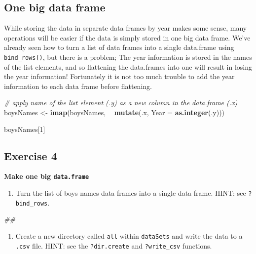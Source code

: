 \documentclass[
]{book}
\newenvironment{Shaded}{\begin{snugshade}}{\end{snugshade}}
\newcommand{\CommentTok}[1]{\textcolor[rgb]{0.56,0.35,0.01}{\textit{#1}}}
\newcommand{\DataTypeTok}[1]{\textcolor[rgb]{0.13,0.29,0.53}{#1}}
\newcommand{\DecValTok}[1]{\textcolor[rgb]{0.00,0.00,0.81}{#1}}
\newcommand{\KeywordTok}[1]{\textcolor[rgb]{0.13,0.29,0.53}{\textbf{#1}}}
\newcommand{\NormalTok}[1]{#1}
\newcommand{\OperatorTok}[1]{\textcolor[rgb]{0.81,0.36,0.00}{\textbf{#1}}}
\newcommand{\StringTok}[1]{\textcolor[rgb]{0.31,0.60,0.02}{#1}}
\providecommand{\tightlist}{%
  \setlength{\itemsep}{0pt}\setlength{\parskip}{0pt}}
\begin{document}
\hypertarget{one-big-data-frame}{%
\subsection{One big data frame}\label{one-big-data-frame}}

While storing the data in separate data frames by year makes some sense,
many operations will be easier if the data is simply stored in one big
data frame. We've already seen how to turn a list of data frames into a
single data.frame using \texttt{bind\_rows()}, but there is a problem; The year
information is stored in the names of the list elements, and so
flattening the data.frames into one will result in losing the year
information! Fortunately it is not too much trouble to add the year
information to each data frame before flattening.

\begin{Shaded}
\begin{Highlighting}[]
\CommentTok{# apply name of the list element (.y) as a new column in the data.frame (.x)}
\NormalTok{boysNames <-}\StringTok{ }\KeywordTok{imap}\NormalTok{(boysNames, }\OperatorTok{~}\StringTok{ }\KeywordTok{mutate}\NormalTok{(.x, }\DataTypeTok{Year =} \KeywordTok{as.integer}\NormalTok{(.y)))}

\NormalTok{boysNames[}\DecValTok{1}\NormalTok{]}
\end{Highlighting}
\end{Shaded}

\hypertarget{exercise-4-1}{%
\subsection{Exercise 4}\label{exercise-4-1}}

\textbf{Make one big \texttt{data.frame}}

\begin{enumerate}
\def\labelenumi{\arabic{enumi}.}
\tightlist
\item
  Turn the list of boys names data frames into a single data frame. HINT: see \texttt{?bind\_rows}.
\end{enumerate}

\begin{Shaded}
\begin{Highlighting}[]
\CommentTok{## }
\end{Highlighting}
\end{Shaded}

\begin{enumerate}
\def\labelenumi{\arabic{enumi}.}
\setcounter{enumi}{1}
\tightlist
\item
  Create a new directory called \texttt{all} within \texttt{dataSets} and write the data to a \texttt{.csv} file.
  HINT: see the \texttt{?dir.create} and \texttt{?write\_csv} functions.
\end{enumerate}
\end{document}
